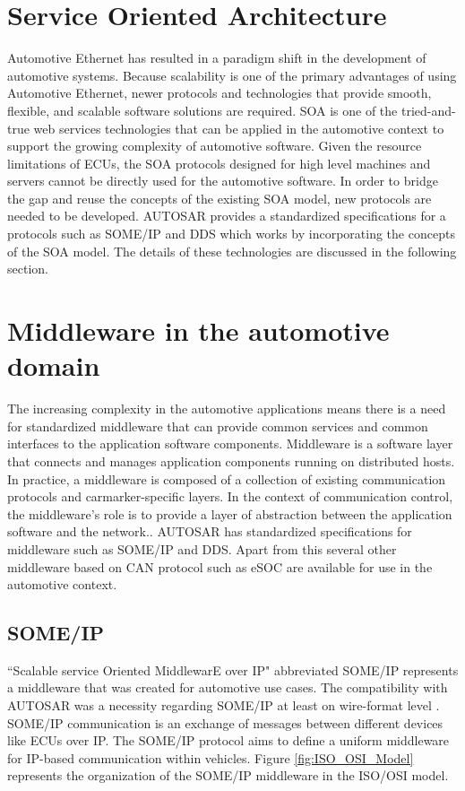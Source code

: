 \section{Service Oriented Architecture}
Automotive Ethernet has resulted in a paradigm shift in the development of automotive systems. Because scalability is one of the primary advantages of using Automotive Ethernet, newer protocols and technologies that provide smooth, flexible, and scalable software solutions are required. SOA is one of the tried-and-true web services technologies that can be applied in the automotive context to support the growing complexity of automotive software\cite{b1.2}. Given the resource limitations of ECUs, the SOA protocols designed for high level machines and servers cannot be directly used for the automotive software. In order to bridge the gap and reuse the concepts of the existing SOA model, new protocols are needed to be developed. AUTOSAR provides a standardized specifications for a protocols such as SOME/IP and DDS which works by incorporating the concepts of the SOA model. The details of these technologies are discussed in the following section.   

\section{Middleware in the automotive domain}
The increasing complexity in the automotive applications means there is a need for standardized middleware that can provide common services and common interfaces to the application software components\cite{b_TrendsInACS}. Middleware is a software layer that connects and manages application components running on distributed hosts\cite{b_middleware}. In practice, a middleware is composed of a collection of existing communication protocols and carmarker-specific layers\cite{b_TrendsInACS}. In the context of communication control, the middleware's role is to provide a layer of abstraction between the application software and the network.\cite{b1.4}. AUTOSAR has standardized specifications for middleware such as SOME/IP and DDS\cite{b_TrendsInACS}. Apart from this several other middleware based on CAN protocol such as eSOC\cite{b_TrendsInACS} are available for use in the automotive context. 

\subsection{SOME/IP}
``Scalable service Oriented MiddlewarE over IP" abbreviated SOME/IP represents a middleware that was created for automotive use cases\cite{b1.1}. The compatibility with AUTOSAR was a necessity regarding SOME/IP at least on wire-format level \cite{b1.1}. SOME/IP communication is an exchange of messages between different devices like ECUs over IP\cite{b1.1}. The SOME/IP protocol aims to define a uniform middleware for IP-based communication within vehicles. Figure \ref{fig:ISO_OSI_Model} represents the organization of the SOME/IP middleware in the ISO/OSI model.
\par  

